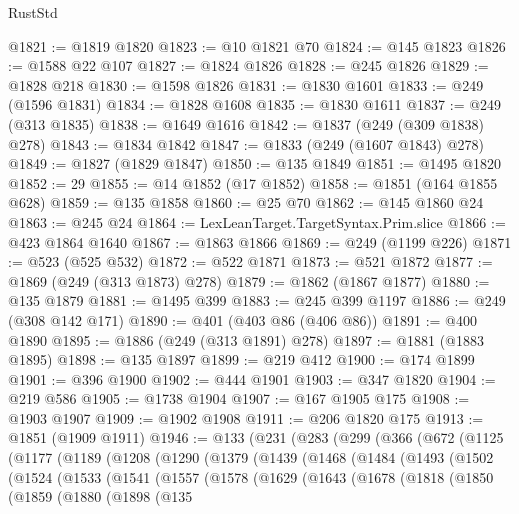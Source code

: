 \begin{lexlean}{RustStd}
\begin{coremodule}
@1821 := @1819 @1820
@1823 := @10 @1821 @70
@1824 := @145 @1823
@1826 := @1588 @22 @107
@1827 := @1824 @1826
@1828 := @245 @1826
@1829 := @1828 @218
@1830 := @1598 @1826
@1831 := @1830 @1601
@1833 := @249 (@1596 @1831)
@1834 := @1828 @1608
@1835 := @1830 @1611
@1837 := @249 (@313 @1835)
@1838 := @1649 @1616
@1842 := @1837 (@249 (@309 @1838) @278)
@1843 := @1834 @1842
@1847 := @1833 (@249 (@1607 @1843) @278)
@1849 := @1827 (@1829 @1847)
@1850 := @135 @1849
@1851 := @1495 @1820
@1852 := 29
@1855 := @14 @1852 (@17 @1852)
@1858 := @1851 (@164 @1855 @628)
@1859 := @135 @1858
@1860 := @25 @70
@1862 := @145 @1860 @24
@1863 := @245 @24
@1864 := LexLeanTarget.TargetSyntax.Prim.slice
@1866 := @423 @1864 @1640
@1867 := @1863 @1866
@1869 := @249 (@1199 @226)
@1871 := @523 (@525 @532)
@1872 := @522 @1871
@1873 := @521 @1872
@1877 := @1869 (@249 (@313 @1873) @278)
@1879 := @1862 (@1867 @1877)
@1880 := @135 @1879
@1881 := @1495 @399
@1883 := @245 @399 @1197
@1886 := @249 (@308 @142 @171)
@1890 := @401 (@403 @86 (@406 @86))
@1891 := @400 @1890
@1895 := @1886 (@249 (@313 @1891) @278)
@1897 := @1881 (@1883 @1895)
@1898 := @135 @1897
@1899 := @219 @412
@1900 := @174 @1899
@1901 := @396 @1900
@1902 := @444 @1901
@1903 := @347 @1820
@1904 := @219 @586
@1905 := @1738 @1904
@1907 := @167 @1905 @175
@1908 := @1903 @1907
@1909 := @1902 @1908
@1911 := @206 @1820 @175
@1913 := @1851 (@1909 @1911)
@1946 := @133
    (@231
      (@283
        (@299
          (@366
            (@672
              (@1125
                (@1177
                  (@1189
                    (@1208
                      (@1290
                        (@1379
                          (@1439
                            (@1468
                              (@1484
                                (@1493
                                  (@1502
                                    (@1524
                                      (@1533
                                        (@1541
                                          (@1557
                                            (@1578
                                              (@1629
                                                (@1643
                                                  (@1678
                                                    (@1818
                                                      (@1850
                                                        (@1859
                                                          (@1880
                                                            (@1898
                                                              (@135

\end{coremodule}
\end{lexlean}
